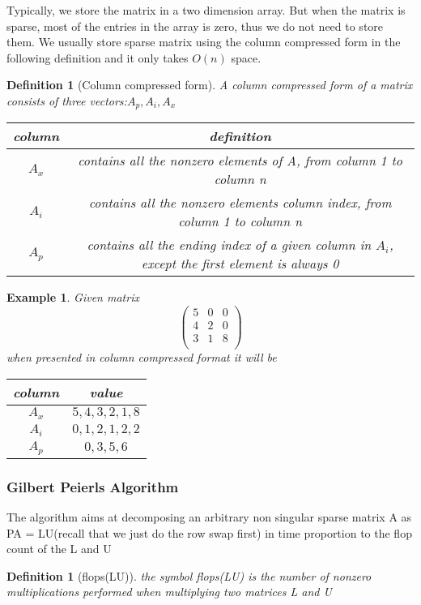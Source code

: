 \documentclass[11pt]{article}
\newtheorem{example}[theorem]{Example}
\newtheorem{definition}[theorem]{Definition}
\begin{document}
Typically, we store the matrix in a two dimension array. But when the matrix is sparse, most of the entries in the array is zero, thus we do not need to store them. We usually store sparse matrix using the column compressed form in the following definition and it only takes $O(n)$ space.
\begin{definition}
[Column compressed form]
A column compressed form of a matrix consists of three vectors:$A_{p},A_{i},A_{x}$
\begin{table}[h]
    \centering
    \begin{tabular}{c||c}
    \hline
    column  & definition\\ \hline
    $A_{x}$ & contains all the nonzero elements of A, from column 1 to column n \\ 
    $A_{i}$ & contains all the nonzero elements column index, from column 1 to column n \\
    $A_{p}$ & contains all the ending index of a given column in $A_{i}$, except the first element is always 0 \\ \hline
    \end{tabular}
\end{table}
\end{definition}
\begin{example}
Given matrix
\[\left(
    \begin{array}{ccc}
        5 & 0 & 0\\
        4 & 2 & 0\\
        3 & 1 & 8\\
    \end{array}
\right)\]
when presented in column compressed format it will be
\begin{table}[h]
    \centering
    \begin{tabular}{c||c}
    \hline
    column  & value    \\ \hline
    $A_{x}$ & $5,4,3,2,1,8$     \\
    $A_{i}$ & $0,1,2,1,2,2$ \\
    $A_{p}$ & $0,3,5,6$     \\ \hline
    \end{tabular}
\end{table}
\end{example}

\subsubsection{Gilbert Peierls Algorithm}
The algorithm aims at decomposing an arbitrary non singular sparse matrix A as PA = LU(recall that we just do the row swap first) in time proportion to the flop count of the L and U
\begin{definition}
[flops(LU)]
the symbol flops(LU) is the number of nonzero multiplications performed when multiplying two matrices L and U
\end{definition}
\end{document}
